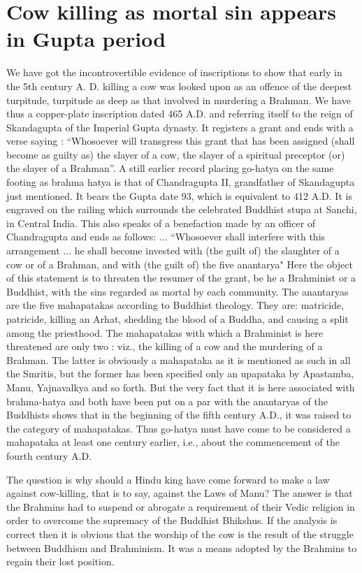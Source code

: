 \documentclass{article}
\begin{document}
\section{Cow killing as mortal sin appears in Gupta period}
\begin{shadequote}
We have got the incontrovertible evidence of inscriptions to show that early in the 5th century A. D. killing a cow was looked upon as an offence of the deepest turpitude, turpitude as deep as that involved in murdering a Brahman. We have thus a copper-plate inscription dated 465 A.D. and referring itself to the reign of Skandagupta of the Imperial Gupta dynasty. It registers a grant and ends with a verse saying : ``Whosoever will transgress this grant that has been assigned (shall become as guilty as) the slayer of a cow, the slayer of a spiritual preceptor (or) the slayer of a Brahman''. A still earlier record placing go-hatya on the same footing as brahma hatya is that of Chandragupta II, grandfather of Skandagupta just mentioned. It bears the Gupta date 93, which is equivalent to 412 A.D. It is engraved on the railing which surrounds the celebrated Buddhist stupa at Sanchi, in Central India. This also speaks of a benefaction made by an officer of Chandragupta and ends as follows:  ... ``Whosoever shall interfere with this arrangement ... he shall become invested with (the guilt of) the slaughter of a cow or of a Brahman, and with (the guilt of) the five anantarya" Here the object of this statement is to threaten the resumer of the grant, be he a Brahminist or a Buddhist, with the sins regarded as mortal by each community. The anantaryas are the five mahapatakas according to Buddhist theology. They are: matricide, patricide, killing an Arhat, shedding the blood of a Buddha, and causing a split among the priesthood. The mahapatakas with which a Brahminist is here threatened are only two : viz., the killing of a cow and the murdering of a Brahman. The latter is obviously a mahapataka as it is mentioned as such in all the Smritis, but the former has been specified only an upapataka by Apastamba, Manu, Yajnavalkya and so forth. But the very fact that it is here associated with brahma-hatya and both have been put on a par with the anantaryas of the Buddhists shows that in the beginning of the fifth century A.D., it was raised to the category of mahapatakas. Thus go-hatya must have come to be considered a mahapataka at least one century earlier, i.e., about the commencement of the fourth century A.D.

The question is why should a Hindu king have come forward to make a law against cow-killing, that is to say, against the Laws of Manu? The answer is that the Brahmins had to suspend or abrogate a requirement of their Vedic religion in order to overcome the supremacy of the Buddhist Bhikshus. If the analysis is correct then it is obvious that the worship of the cow is the result of the struggle between Buddhism and Brahminism. It was a means adopted by the Brahmins to regain their lost position.
\end{shadequote}
\end{document}
